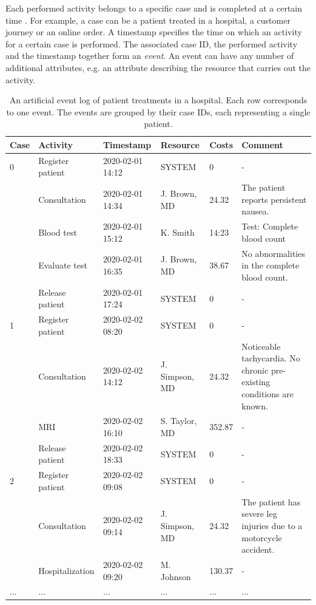 Each performed activity belongs to a specific case and is completed at a certain time \cite{DBLP:conf/bpm/AalstAM11}.
For example, a case can be a patient treated in a hospital, a customer journey or an online order.
A timestamp specifies the time on which an activity for a certain case is performed.
The associated case ID, the performed activity and the timestamp together form an \textit{event}.
An event can have any number of additional attributes, e.g. an attribute describing the resource that carries out the activity.
\begin{table}[htbp!]
	\small
	\setlength\tabcolsep{3pt}
	\begin{tabularx}{\textwidth}{lllllp{4.5cm}}
		\toprule
		\textbf{Case} & \textbf{Activity}          & \textbf{Timestamp} & \textbf{Resource} & \textbf{Costs} & \textbf{Comment}  \\
		\midrule
		0                & Register patient           & 2020-02-01 14:12   & SYSTEM            & 0             & -     \\
		& Consultation               & 2020-02-01 14:34   & J. Brown, MD    & 24.32         & The patient reports persistent nausea.   \\
		& Blood test                 & 2020-02-01 15:12   & K. Smith         & 14:23         & Test: Complete blood count    \\
		& Evaluate test  & 2020-02-01 16:35   & J. Brown, MD    & 38.67         &No abnormalities in the complete blood count.   \\
		& Release patient            & 2020-02-01 17:24   & SYSTEM            & 0             & -  \\
		\midrule
		1                & Register patient           & 2020-02-02 08:20   & SYSTEM            & 0             & -  \\
		& Consultation               & 2020-02-02 14:12   & J. Simpson, MD  & 24.32         & Noticeable tachycardia. No chronic pre-existing conditions are known.    \\
		& MRI & 2020-02-02 16:10   & S. Taylor, MD   & 352.87        & -    \\
		& Release patient            & 2020-02-02 18:33   & SYSTEM            & 0             & -   \\
		\midrule
		2                & Register patient           & 2020-02-02 09:08   & SYSTEM            & 0             & -    \\
		& Consultation               & 2020-02-02 09:14   & J. Simpson, MD  & 24.32         & The patient has severe leg injuries due to a motorcycle accident.  \\
		& Hospitalization       & 2020-02-02 09:20   & M. Johnson      & 130.37        & -     \\
		...              & ...                        & ...                & ...               & ...           & ...     \\
		\bottomrule
	\end{tabularx}
	\caption[Artificial event log of patient treatments in a hospital]{An artificial event log of patient treatments in a hospital. Each row corresponds to one event. The events are grouped by their case IDs, each representing a single patient.}
	\label{tab:event-log}
\end{table}

